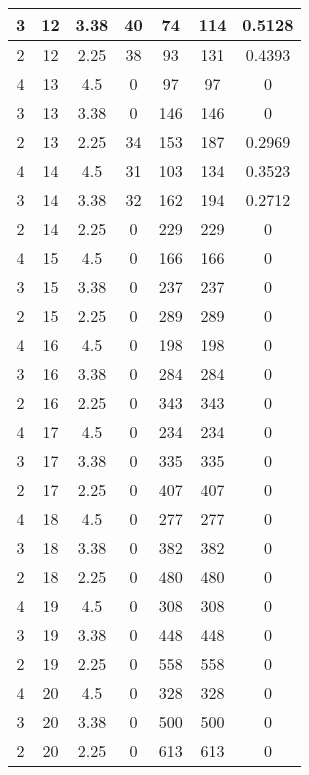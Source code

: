 \documentclass[letterpaper, 12pt]{article}
\begin{document}
\begin{longtable}{|c|c|c|c|c|c|c|}
\hline
3 & 12 & 3.38 & 40 & 74 & 114 & 0.5128 \\
\hline
2 & 12 & 2.25 & 38 & 93 & 131 & 0.4393 \\
\hline
4 & 13 & 4.5 & 0 & 97 & 97 & 0 \\
\hline
3 & 13 & 3.38 & 0 & 146 & 146 & 0 \\
\hline
2 & 13 & 2.25 & 34 & 153 & 187 & 0.2969 \\
\hline
4 & 14 & 4.5 & 31 & 103 & 134 & 0.3523 \\
\hline
3 & 14 & 3.38 & 32 & 162 & 194 & 0.2712 \\
\hline
2 & 14 & 2.25 & 0 & 229 & 229 & 0 \\
\hline
4 & 15 & 4.5 & 0 & 166 & 166 & 0 \\
\hline
3 & 15 & 3.38 & 0 & 237 & 237 & 0 \\
\hline
2 & 15 & 2.25 & 0 & 289 & 289 & 0 \\
\hline
4 & 16 & 4.5 & 0 & 198 & 198 & 0 \\
\hline
3 & 16 & 3.38 & 0 & 284 & 284 & 0 \\
\hline
2 & 16 & 2.25 & 0 & 343 & 343 & 0 \\
\hline
4 & 17 & 4.5 & 0 & 234 & 234 & 0 \\
\hline
3 & 17 & 3.38 & 0 & 335 & 335 & 0 \\
\hline
2 & 17 & 2.25 & 0 & 407 & 407 & 0 \\
\hline
4 & 18 & 4.5 & 0 & 277 & 277 & 0 \\
\hline
3 & 18 & 3.38 & 0 & 382 & 382 & 0 \\
\hline
2 & 18 & 2.25 & 0 & 480 & 480 & 0 \\
\hline
4 & 19 & 4.5 & 0 & 308 & 308 & 0 \\
\hline
3 & 19 & 3.38 & 0 & 448 & 448 & 0 \\
\hline
2 & 19 & 2.25 & 0 & 558 & 558 & 0 \\
\hline
4 & 20 & 4.5 & 0 & 328 & 328 & 0 \\
\hline
3 & 20 & 3.38 & 0 & 500 & 500 & 0 \\
\hline
2 & 20 & 2.25 & 0 & 613 & 613 & 0 \\
\hline
\end{longtable}
\end{document}
